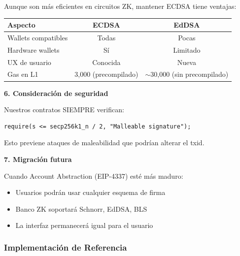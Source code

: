 \documentclass[11pt,a4paper,twoside,openright]{book}
\theoremstyle{definition}
\theoremstyle{plain}
\theoremstyle{remark}
\begin{document}
\begin{bancozk}
Aunque son más eficientes en circuitos ZK, mantener ECDSA tiene ventajas:
\begin{center}
\begin{tabular}{lcc}
\toprule
\textbf{Aspecto} & \textbf{ECDSA} & \textbf{EdDSA} \\
\midrule
Wallets compatibles & Todas & Pocas \\
Hardware wallets & Sí & Limitado \\
UX de usuario & Conocida & Nueva \\
Gas en L1 & 3,000 (precompilado) & $\sim$30,000 (sin precompilado) \\
\bottomrule
\end{tabular}
\end{center}

\textbf{6. Consideración de seguridad}

Nuestros contratos SIEMPRE verifican:
\begin{verbatim}
require(s <= secp256k1_n / 2, "Malleable signature");
\end{verbatim}

Esto previene ataques de maleabilidad que podrían alterar el txid.

\textbf{7. Migración futura}

Cuando Account Abstraction (EIP-4337) esté más maduro:
\begin{itemize}
    \item Usuarios podrán usar cualquier esquema de firma
    \item Banco ZK soportará Schnorr, EdDSA, BLS
    \item La interfaz permanecerá igual para el usuario
\end{itemize}
\end{bancozk}

\subsubsection{Implementación de Referencia}
\end{document}
